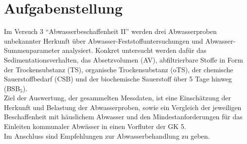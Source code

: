 \chapter{Aufgabenstellung}
\label{sec:aufgabenstellung}

Im Versuch 3 "`Abwasserbeschaffenheit II"' werden drei Abwasserproben unbekannter Herkunft über Abwasser-Feststoffuntersuchungen und Abwasser-Summenparameter analysiert. Konkret untersucht werden dafür das Sedimentationsverhalten, das Absetzvolumen (AV), abfiltrierbare Stoffe in Form der Trockensubstanz (TS), organische Trockensubstanz (oTS), der chemische Sauerstoffbedarf (CSB) und der biochemische Sauerstoff über 5 Tage hinweg (BSB$_5$).\\
Ziel der Auswertung, der gesammelten Messdaten, ist eine Einschätzung der Herkunft und Belastung der Abwasserproben, sowie ein Vergleich der jeweiligen Beschaffenheit mit häuslichem Abwasser und den Mindestanforderungen für das Einleiten kommunaler Abwässer in einen Vorfluter der GK 5. \\
Im Anschluss sind Empfehlungen zur Abwasserbehandlung zu geben.